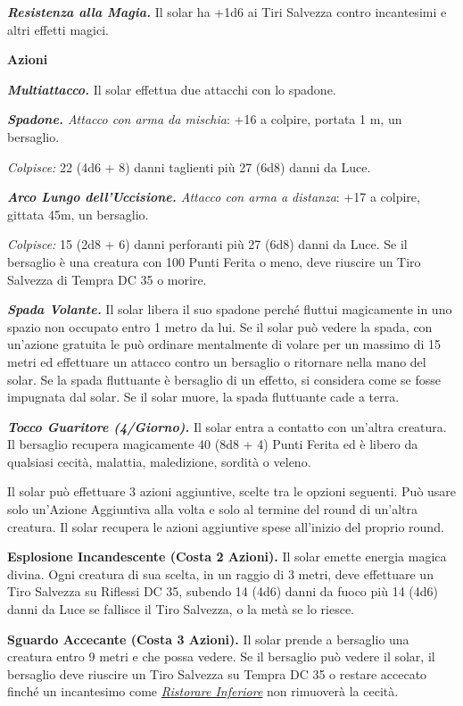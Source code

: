 \begin{multicols}{2}
{\emph{\textbf{Resistenza alla Magia.}} Il solar ha +1d6 ai Tiri Salvezza contro incantesimi e altri effetti magici.

\textbf{Azioni}

\emph{\textbf{Multiattacco.}} Il solar effettua due attacchi con lo spadone.

\emph{\textbf{Spadone.} Attacco con arma da mischia}: +16 a colpire, portata 1 m, un bersaglio.

\emph{Colpisce:} 22 (4d6 + 8) danni taglienti più 27 (6d8) danni da Luce.

\emph{\textbf{Arco Lungo dell'Uccisione.} Attacco con arma a distanza}: +17 a colpire, gittata 45m, un bersaglio.

\emph{Colpisce:} 15 (2d8 + 6) danni perforanti più 27 (6d8) danni da Luce. Se il bersaglio è una creatura con 100 Punti Ferita o meno, deve riuscire un Tiro Salvezza di Tempra DC 35 o morire.

\emph{\textbf{Spada Volante.}} Il solar libera il suo spadone perché fluttui magicamente in uno spazio non occupato entro 1 metro da lui. Se il solar può vedere la spada, con un'azione gratuita le può ordinare mentalmente di volare per un massimo di 15 metri ed effettuare un attacco contro un bersaglio o ritornare nella mano del solar. Se la spada fluttuante è bersaglio di un effetto, si considera come se fosse impugnata dal solar. Se il solar muore, la spada fluttuante cade a terra.

\emph{\textbf{Tocco Guaritore (4/Giorno).}} Il solar entra a contatto con un'altra creatura. Il bersaglio recupera magicamente 40 (8d8 + 4) Punti Ferita ed è libero da qualsiasi cecità, malattia, maledizione, sordità o veleno.

Il solar può effettuare 3 azioni aggiuntive, scelte tra le opzioni seguenti. Può usare solo un'Azione Aggiuntiva alla volta e solo al termine del round di un'altra creatura. Il solar recupera le azioni aggiuntive spese all'inizio del proprio round.

\textbf{Esplosione Incandescente (Costa 2 Azioni).} Il solar emette energia magica divina. Ogni creatura di sua scelta, in un raggio di 3 metri, deve effettuare un Tiro Salvezza su Riflessi DC 35, subendo 14 (4d6) danni da fuoco più 14 (4d6) danni da Luce se fallisce il Tiro Salvezza, o la metà se lo riesce.

\textbf{Sguardo Accecante (Costa 3 Azioni).} Il solar prende a bersaglio una creatura entro 9 metri e che possa vedere. Se il bersaglio può vedere il solar, il bersaglio deve riuscire un Tiro Salvezza su Tempra DC 35 o restare accecato finché un incantesimo come \emph{\hyperlink{Ristorare Inferiore}{Ristorare Inferiore}} non rimuoverà la cecità.

}
\end{multicols}
